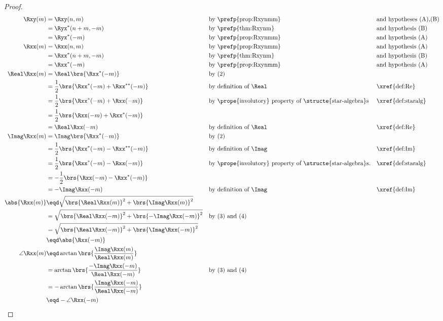 \begin{proof}
\begin{align*}
  \Rxy(m)
     &= \Rxy(n,m)
     && \text{by \prefp{prop:Rxynmm}}
     && \text{and hypotheses (A),(B)}
   \\&= \Ryx^\ast(n+m,-m)
     && \text{by \prefp{thm:Rxynm}}
     && \text{and hypothesis (B)}
   \\&= \Ryx^\ast(-m)
     && \text{by \prefp{prop:Rxynmm}}
     && \text{and hypothesis (A)}
   \\
  \Rxx(m)
     &= \Rxx(n,m)
     && \text{by \prefp{prop:Rxynmm}}
     && \text{and hypothesis (A)}
   \\&= \Rxx^\ast(n+m,-m)
     && \text{by \prefp{thm:Rxynm}}
     && \text{and hypothesis (B)}
   \\&= \Rxx^\ast(-m)
     && \text{by \prefp{prop:Rxynmm}}
     && \text{and hypothesis (A)}
  \\
  \Real \Rxx(m)
    &=  \Real\brs{\Rxx^\ast(-m)}
    && \text{by (2)}
  \\&=  \frac{1}{2}\brs{\Rxx^\ast(-m) + \Rxx^{\ast\ast}(-m)}
    && \text{by definition of $\Real$}
    && \text{\xref{def:Re}}
  \\&=  \frac{1}{2}\brs{\Rxx^\ast(-m) + \Rxx(-m)}
    && \text{by \prope{involutory} property of \structe{star-algebra}s}
    && \text{\xref{def:staralg}}
  \\&=  \frac{1}{2}\brs{\Rxx(-m) + \Rxx^\ast(-m)}
  \\&=  \Real\Rxx(-m)
    && \text{by definition of $\Real$}
    && \text{\xref{def:Re}}
  \\
  \Imag \Rxx(m)
    &=  \Imag\brs{\Rxx^\ast(-m)}
    && \text{by (2)}
  \\&=  \frac{1}{2}\brs{\Rxx^\ast(-m) - \Rxx^{\ast\ast}(-m)}
    && \text{by definition of $\Imag$}
    && \text{\xref{def:Im}}
  \\&=  \frac{1}{2}\brs{\Rxx^\ast(-m) - \Rxx(-m)}
    && \text{by \prope{involutory} property of \structe{star-algebra}s.}
    && \text{\xref{def:staralg}}
  \\&=  -\frac{1}{2}\brs{\Rxx(-m) - \Rxx^\ast(-m)}
  \\&=  -\Imag\Rxx(-m)
    && \text{by definition of $\Imag$}
    && \text{\xref{def:Im}}
  \\
  \abs{ \Rxx(m) }
    &\eqd \sqrt{ \brs{\Real\Rxx( m)}^2 + \brs{ \Imag\Rxx( m)}^2 }
  \\&=    \sqrt{ \brs{\Real\Rxx(-m)}^2 + \brs{-\Imag\Rxx(-m)}^2 }
    &&    \text{by (3) and (4)}
  \\&=    \sqrt{ \brs{\Real\Rxx(-m)}^2 + \brs{ \Imag\Rxx(-m)}^2 }
  \\&\eqd \abs{ \Rxx(-m) }
  \\
  \angle{ \Rxx(m) }
    &\eqd \arctan\brs{ \frac{\Imag\Rxx(m)}{\Real\Rxx(m)} }
  \\&=    \arctan\brs{ \frac{-\Imag\Rxx(-m)}{\Real\Rxx(-m)} }
    &&    \text{by (3) and (4)}
  \\&=   -\arctan\brs{ \frac{\Imag\Rxx(-m)}{\Real\Rxx(-m)} }
  \\&\eqd -\angle{ \Rxx(-m) }
\end{align*}
\end{proof}

